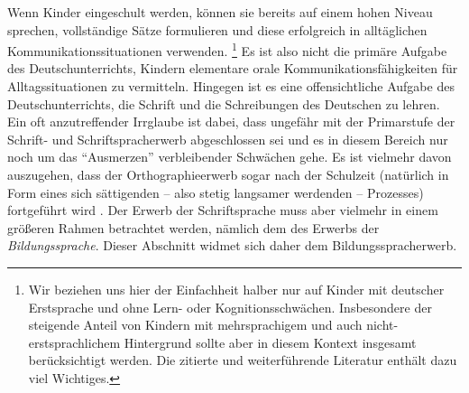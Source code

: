 Wenn Kinder eingeschult werden, können sie bereits auf einem hohen Niveau sprechen, vollständige Sätze formulieren und diese erfolgreich in alltäglichen Kommunikationssituationen verwenden.%
\footnote{Wir beziehen uns hier der Einfachheit halber nur auf Kinder mit deutscher Erstsprache und ohne Lern- oder Kognitionsschwächen.
Insbesondere der steigende Anteil von Kindern mit mehrsprachigem und auch nicht-erstsprachlichem Hintergrund sollte aber in diesem Kontext insgesamt berücksichtigt werden.
Die zitierte und weiterführende Literatur enthält dazu viel Wichtiges.}
Es ist also nicht die primäre Aufgabe des Deutschunterrichts, Kindern elementare orale Kommunikationsfähigkeiten für Alltagssituationen zu vermitteln.
Hingegen ist es eine offensichtliche Aufgabe des Deutschunterrichts, die Schrift und die Schreibungen des Deutschen zu lehren.
Ein oft anzutreffender Irrglaube ist dabei, dass ungefähr mit der Primarstufe der Schrift- und Schriftspracherwerb abgeschlossen sei und es in diesem Bereich nur noch um das "`Ausmerzen"' verbleibender Schwächen gehe.
Es ist vielmehr davon auszugehen, dass der Orthographieerwerb sogar nach der Schulzeit (natürlich in Form eines sich sättigenden -- also stetig langsamer werdenden -- Prozesses) fortgeführt wird \citep[72]{Portmanntselikas2011}.
Der Erwerb der Schriftsprache muss aber vielmehr in einem größeren Rahmen betrachtet werden, nämlich dem des Erwerbs der \textit{Bildungssprache}.
Dieser Abschnitt widmet sich daher dem Bildungsspracherwerb.

